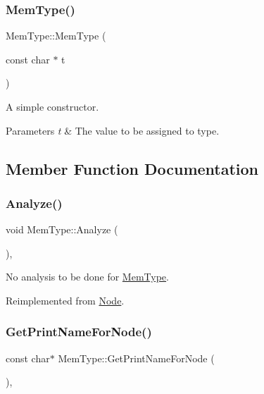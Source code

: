\subsubsection{\texorpdfstring{Mem\+Type()}{MemType()}}
{\footnotesize\ttfamily Mem\+Type\+::\+Mem\+Type (\begin{DoxyParamCaption}\item[{const char $\ast$}]{t }\end{DoxyParamCaption})}

A simple constructor. 
\begin{DoxyParams}{Parameters}
{\em t} & The value to be assigned to type. \\
\hline
\end{DoxyParams}


\subsection{Member Function Documentation}
\mbox{\label{class_mem_type_a40773866273e8e3321c67d1bfaab14da}} 
\subsubsection{\texorpdfstring{Analyze()}{Analyze()}}
{\footnotesize\ttfamily void Mem\+Type\+::\+Analyze (\begin{DoxyParamCaption}{ }\end{DoxyParamCaption})\hspace{0.3cm}{\ttfamily [inline]}, {\ttfamily [virtual]}}

No analysis to be done for \hyperlink{class_mem_type}{Mem\+Type}. 

Reimplemented from \hyperlink{class_node_a5f88d55c6f253a29def7ccc443d83d47}{Node}.

\mbox{\label{class_mem_type_a9ffea7894f0e757aab866a467b0ae563}} 
\subsubsection{\texorpdfstring{Get\+Print\+Name\+For\+Node()}{GetPrintNameForNode()}}
{\footnotesize\ttfamily const char$\ast$ Mem\+Type\+::\+Get\+Print\+Name\+For\+Node (\begin{DoxyParamCaption}{ }\end{DoxyParamCaption})\hspace{0.3cm}{\ttfamily [inline]}, {\ttfamily [virtual]}}

